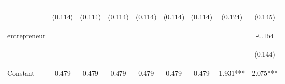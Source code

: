 \begin{center}
\begin{tabular}{lcccccccc}
\vspace{4pt} & \begin{footnotesize}(0.114)\end{footnotesize} & \begin{footnotesize}(0.114)\end{footnotesize} & \begin{footnotesize}(0.114)\end{footnotesize} & \begin{footnotesize}(0.114)\end{footnotesize} & \begin{footnotesize}(0.114)\end{footnotesize} & \begin{footnotesize}(0.114)\end{footnotesize} & \begin{footnotesize}(0.124)\end{footnotesize} & \begin{footnotesize}(0.145)\end{footnotesize} \\
entrepreneur &  &  &  &  &  &  &  & -0.154 \\
\vspace{4pt} & \begin{footnotesize}\end{footnotesize} & \begin{footnotesize}\end{footnotesize} & \begin{footnotesize}\end{footnotesize} & \begin{footnotesize}\end{footnotesize} & \begin{footnotesize}\end{footnotesize} & \begin{footnotesize}\end{footnotesize} & \begin{footnotesize}\end{footnotesize} & \begin{footnotesize}(0.144)\end{footnotesize} \\
Constant & 0.479 & 0.479 & 0.479 & 0.479 & 0.479 & 0.479 & 1.931*** & 2.075*** \\

\end{tabular}
\end{center}
